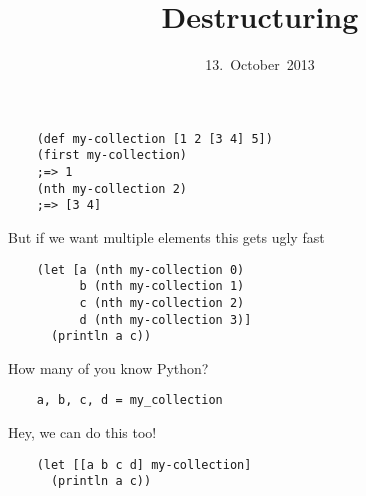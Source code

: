 

\title{Destructuring}
\date{13.~October~2013}



\frame{\titlepage}




\begin{frame}[fragile]
  \begin{verbatim}
    (def my-collection [1 2 [3 4] 5])
    (first my-collection)
    ;=> 1
    (nth my-collection 2)
    ;=> [3 4]
  \end{verbatim}
\end{frame}

\begin{frame}[fragile]
  \begin{center}
    But if we want multiple elements this gets ugly fast
  \end{center}
  \begin{verbatim}
    (let [a (nth my-collection 0)
          b (nth my-collection 1)
          c (nth my-collection 2)
          d (nth my-collection 3)]
      (println a c))
  \end{verbatim}
\end{frame}

\begin{frame}[fragile]
  \begin{center}
    How many of you know Python?
  \end{center}
  \pause
  \begin{verbatim}
    a, b, c, d = my_collection
  \end{verbatim}
\end{frame}


\begin{frame}[fragile]
  \begin{center}
    Hey, we can do this too!
  \end{center}
  \begin{verbatim}
    (let [[a b c d] my-collection]
      (println a c))
  \end{verbatim}
\end{frame}

